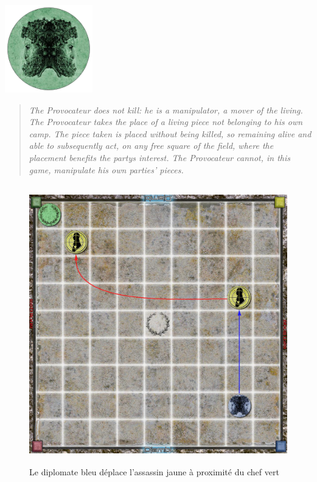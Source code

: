 \documentclass{article}
\begin{document}
\vspace{5pt} %
\noindent %
\begin{minipage}{0.3\textwidth} %
\includegraphics[width=1.5in,height=1.5in]{media/image4.png}
\end{minipage}%
\hfill %
\begin{minipage}{0.75\textwidth} %

\begin{quote}
\textit{The Provocateur does not kill: he is a manipulator, a mover of the
living. The Provocateur takes the place of a living piece not belonging
to his own camp. The piece taken is placed without being killed, so
remaining alive and able to subsequently act, on any free square of the
field, where the placement benefits the party\textquotesingle s
interest. The Provocateur cannot, in this game, manipulate his own
parties' pieces.}
\end{quote}
\end{minipage}

\begin{figure}[ht]
\centering
\includegraphics[width=4.75972in,height=4.76111in]{media/image5.png}
\caption{Le diplomate bleu déplace l'assassin jaune à proximité du chef vert}
\end{figure}
\newpage
\end{document}
